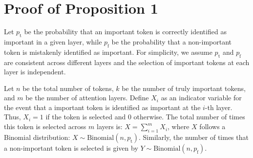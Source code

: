 \section{Proof of Proposition 1}
\label{sec:proof}

Let $p_\mathrm{t}$ be the probability that an important token is correctly identified as important in a given layer, while  $p_\mathrm{f}$ be the probability that a non-important token is mistakenly identified as important. For simplicity, we assume  $p_\mathrm{t}$ and $p_\mathrm{f}$ are consistent across different layers and the selection of important tokens at each layer is independent.

Let $n$ be the total number of tokens, $k$ be the number of truly important tokens, and $m$ be the number of attention layers. 
Define \( X_i \) as an indicator variable for the event that a important token is identified as important at the $i$-th layer. Thus, \( X_i = 1 \) if the token is selected and 0 otherwise. The total number of times this token is selected across $m$ layers is:
$X = \sum_{i=1}^{m} X_i$,
where \( X \) follows a Binomial distribution:
$X \sim \mathrm{Binomial}(n, p_\mathrm{t})$.
Similarly, the number of times that a non-important token is selected is given by $Y \sim \mathrm{Binomial}(n, p_\mathrm{f})$.






